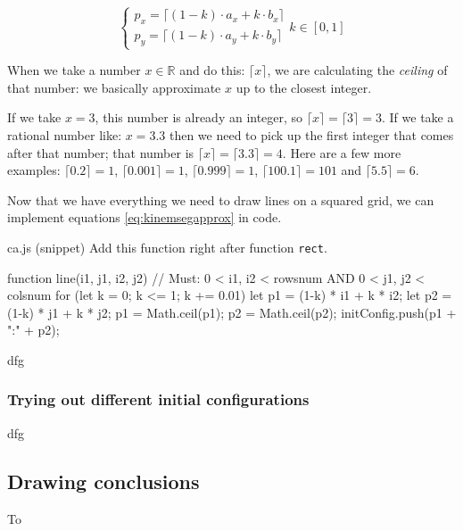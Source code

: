 \begin{equation}
\label{eq:kinemsegapprox}
\begin{cases}
p_x = \lceil (1-k) \cdot a_x + k \cdot b_x \rceil\\
p_y = \lceil (1-k) \cdot a_y + k \cdot b_y \rceil
\end{cases}
k \in [0,1]
\end{equation}

When we take a number $x \in \mathbb{R}$ and do this: $\lceil x \rceil$, we are calculating
the \textit{ceiling} of that number: we basically approximate $x$ up to the closest integer.

\begin{example}
If we take $x = 3$, this number is already an integer, so $\lceil x \rceil = \lceil 3 \rceil = 3$.
If we take a rational number like: $x = 3.3$ then we need to pick up the first integer that
comes after that number; that number is $\lceil x \rceil = \lceil 3.3 \rceil = 4$.
Here are a few more examples: $\lceil 0.2 \rceil = 1$, $\lceil 0.001 \rceil = 1$,
$\lceil 0.999 \rceil = 1$, $\lceil 100.1 \rceil = 101$ and $\lceil 5.5 \rceil = 6$.
\end{example}

Now that we have everything we need to draw lines on a squared grid, we can implement
equations \ref{eq:kinemsegapprox} in code.

\begin{programcode}{ca.js (snippet)}
Add this function right after function \texttt{rect}.
\begin{code}
function line(i1, j1, i2, j2) {
  // Must: 0 < i1, i2 < rowsnum AND 0 < j1, j2 < colsnum
  for (let k = 0; k <= 1; k += 0.01) {
    let p1 = (1-k) * i1 + k * i2;
    let p2 = (1-k) * j1 + k * j2;
    p1 = Math.ceil(p1);
    p2 = Math.ceil(p2);
    initConfig.push(p1 + ":" + p2);
  }
}
\end{code}
\end{programcode}

dfg

\subsubsection{Trying out different initial configurations}
dfg

\subsection{Drawing conclusions}
To
